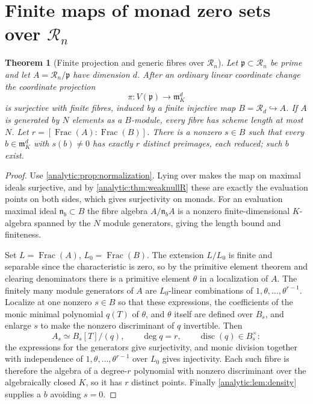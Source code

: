 \documentclass[11pt,letterpaper]{article}
\newtheorem{theorem}{Theorem}[section]
\theoremstyle{definition}
\theoremstyle{remark}
\newcommand{\RR}{\mathscr R}
\newcommand{\m}{\mathfrak m}
\newcommand{\pp}{\mathfrak p}
\newcommand{\Frac}{\operatorname{Frac}}
\newcommand{\disc}{\operatorname{disc}}
\numberwithin{equation}{section}
\begin{document}
\section{Finite maps of monad zero sets over $\RR_n$}
\label{analytic:sec:finite}

\begin{theorem}[Finite projection and generic fibres over $\RR_n$]
\label{analytic:thm:finitemap}
Let $\pp\subset\RR_n$ be prime and let $A=\RR_n/\pp$ have dimension $d$.
After an ordinary linear coordinate change the coordinate projection
\[
 \pi:V(\pp)\longrightarrow\m_K^d
\]
is surjective with finite fibres, induced by a finite injective map
$B=\RR_d\hookrightarrow A$. If $A$ is generated by $N$ elements as a
$B$-module, every fibre has scheme length at most $N$. Let
$r=[\Frac(A):\Frac(B)]$. There is a nonzero $s\in B$ such that every
$b\in\m_K^d$ with $s(b)\ne0$ has exactly $r$ distinct preimages, each
reduced; such $b$ exist.
\end{theorem}
\begin{proof}
Use \cref{analytic:prop:normalization}. Lying over makes the map on maximal
ideals surjective, and by \cref{analytic:thm:weaknullR} these are exactly
the evaluation points on both sides, which gives surjectivity on monads. For
an evaluation maximal ideal $\mathfrak n_b\subset B$ the fibre algebra
$A/\mathfrak n_bA$ is a nonzero finite-dimensional $K$-algebra spanned by
the $N$ module generators, giving the length bound and finiteness.

Set $L=\Frac(A)$, $L_0=\Frac(B)$. The extension $L/L_0$ is finite and
separable since the characteristic is zero, so by the primitive element
theorem and clearing denominators there is a primitive element $\theta$ in a
localization of $A$. The finitely many module generators of $A$ are
$L_0$-linear combinations of $1,\theta,\ldots,\theta^{r-1}$. Localize at one
nonzero $s\in B$ so that these expressions, the coefficients of the monic
minimal polynomial $q(T)$ of $\theta$, and $\theta$ itself are defined over
$B_s$, and enlarge $s$ to make the nonzero discriminant of $q$ invertible.
Then
\[
 A_s\simeq B_s[T]/(q),\qquad\deg q=r,\qquad \disc(q)\in B_s^\times :
\]
the expressions for the generators give surjectivity, and monic division
together with independence of $1,\theta,\ldots,\theta^{r-1}$ over $L_0$
gives injectivity. Each such fibre is therefore the algebra of a degree-$r$
polynomial with nonzero discriminant over the algebraically closed $K$, so
it has $r$ distinct points. Finally \cref{analytic:lem:density} supplies a
$b$ avoiding $s=0$.
\end{proof}
\end{document}
